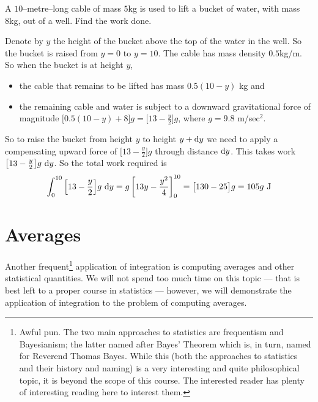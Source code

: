 \begin{eg}\label{eg:WKcable}
A $10$--metre--long cable of mass $5$kg is used to lift a bucket of water,
with mass 8kg, out of a well. Find the work done.

\soln
Denote by $y$ the height of the bucket above the top of the water in the well.
So the bucket is raised from $y=0$ to $y=10$. The cable has mass density
$0.5$kg/m. So when the bucket is at height $y$,
\begin{itemize}\itemsep1pt \parskip0pt  %
\item the cable that remains to be lifted has mass $0.5(10-y)$ kg and
\item the remaining cable and water is subject to a downward gravitational
force of magnitude $\big[0.5(10-y) + 8\big]g=\big[13-\frac{y}{2}\big]g$,
where $g=9.8$ m/sec$^2$.
\end{itemize}
So to raise the bucket from height $y$ to height $y+\mathrm{d}y$ we need
to apply a compensating upward force of $\big[13-\frac{y}{2}\big]g$
through distance $\mathrm{d}y$. This takes work
$\big[13-\frac{y}{2}\big]g\ \dee{y}$.
So the total work required is
\begin{equation*}
\int_0^{10}\Big[13-\frac{y}{2}\Big]g\ \mathrm{d}y
=g\left[13 y-\frac{y^2}{4}\right]_0^{10}
=\big[130-25\big]g
=105 g\ \mathrm{J}
\end{equation*}

\end{eg}


\section{Averages}\label{sec avg}
\newcommand{\ave}{\mathrm{ave}}
\newcommand{\llt}{\left<}
\newcommand{\rgt}{\right>}

Another frequent\footnote{Awful pun. The two main approaches to statistics are
frequentism and Bayesianism; the latter named after Bayes' Theorem which is, in turn,
named for Reverend Thomas Bayes. While this (both the approaches to statistics
and their history and naming) is a very interesting and quite
philosophical topic, it is beyond the scope of this course. The interested reader has
plenty of interesting reading here to interest them.} application of integration is
computing averages and other statistical quantities. We will not spend too much time on
this topic --- that is best left to a proper course in statistics --- however, we will
demonstrate the application of integration to the problem of computing averages.

